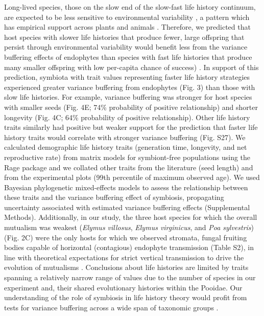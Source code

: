 \documentclass[12pt]{article}
\begin{document}
Long-lived species, those on the slow end of the slow-fast life history continuum, are expected to be less sensitive to environmental variability \cite{murphy1968pattern}, a pattern which has empirical support across plants \cite{compagnoni2021herbaceous} and animals \cite{le2022life,morris2008longevity}.
Therefore, we predicted that host species with slower life histories that produce fewer, large offspring that persist through environmental variability would benefit less from the variance buffering effects of endophytes than species with fast life histories that produce many smaller offspring with low per-capita chance of success) \cite{rees1996evolutionary,moles2004seedling}.
In support of this prediction,  symbiota with trait values representing faster life history strategies experienced greater variance buffering from endophytes (Fig. 3) than those with slow life histories. 
For example, variance buffering was stronger for host species with smaller seeds (Fig. 4E; 74\% probability of positive relationship) and shorter longevity (Fig. 4C; 64\% probability of positive relationship).
Other life history traits similarly had positive but weaker support for the prediction that faster life history traits would correlate with stronger variance buffering (Fig. S27).
We calculated demographic life history traits (generation time, longevity, and net reproductive rate) from matrix models for symbiont-free populations using the Rage package \cite{jones2022rcompadre} and we collated other traits from the literature (seed length) and from the experimental plots (99th percentile of maximum observed age). 
We used Bayesian phylogenetic mixed-effects models to assess the relationship between these traits and the variance buffering effect of symbiosis, propagating uncertainty associated with estimated variance buffering effects (Supplemental Methods).
Additionally, in our study, the three host species for which the overall mutualism was weakest (\emph{Elymus villosus}, \emph{Elymus virginicus}, and \emph{Poa sylvestris}) (Fig. 2C) were the only hosts for which we observed stromata, fungal fruiting bodies capable of horizontal (contagious) endophyte transmission (Table S2), in line with theoretical expectations for strict vertical transmission to drive the evolution of mutualisms \cite{fine1975vectors,afkhami2008symbiosis}.
Conclusions about life histories are limited by traits spanning a relatively narrow range of values due to the number of species in our experiment and, their shared evolutionary histories within the Pooidae. 
Our understanding of the role of symbiosis in life history theory would profit from tests for variance buffering across a wide span of taxonomic groups \cite{jeschke2009roles}.
\end{document}
